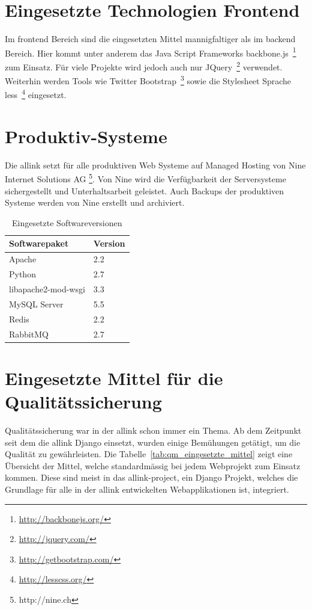 \section{Eingesetzte Technologien Frontend}
\label{sec:eingesetzte_technologien_frontend}
Im frontend Bereich sind die eingesetzten Mittel mannigfaltiger als im backend Bereich. Hier kommt unter anderem das  Java Script Frameworks backbone.js~\footnote{\url{http://backbonejs.org/}} zum Einsatz. Für viele Projekte wird jedoch auch nur JQuery~\footnote{\url{http://jquery.com/}} verwendet. Weiterhin werden Tools wie Twitter Bootstrap~\footnote{\url{http://getbootstrap.com/}} sowie die Stylesheet Sprache less~\footnote{\url{http://lesscss.org/}} eingesetzt.

\section{Produktiv-Systeme}
\label{sec:produktiv_systeme}
Die allink setzt für alle produktiven Web Systeme auf Managed Hosting von Nine Internet Solutions AG \footnote{http://nine.ch}. Von Nine wird die Verfügbarkeit der Serversysteme sichergestellt und Unterhaltsarbeit geleistet. Auch Backups der produktiven Systeme werden von Nine erstellt und archiviert.

\begin{table}[ht]
  \centering
  \begin{tabular}{ll}
  \toprule
    Softwarepaket & Version\\
  \midrule
    Apache & 2.2\\
  \hline
    Python & 2.7\\
  \hline
    libapache2-mod-wsgi & 3.3\\
  \hline
    MySQL Server & 5.5\\
  \hline
    Redis & 2.2\\
  \hline
    RabbitMQ & 2.7\\
  \bottomrule
  \end{tabular}
  \caption{Eingesetzte Softwareversionen}
  \label{tab:eingesetzte_softwareversionen}
\end{table}

\section{Eingesetzte Mittel für die Qualitätssicherung}
\label{sec:eingesetzte_mittel_für_die_qualitätssicherung}
Qualitätssicherung war in der allink schon immer ein Thema. Ab dem Zeitpunkt seit dem die allink Django einsetzt, wurden einige Bemühungen getätigt, um die Qualität zu gewährleisten. Die Tabelle~\ref{tab:qm_eingesetzte_mittel} zeigt eine Übersicht der Mittel, welche standardmässig bei jedem Webprojekt zum Einsatz kommen. Diese sind meist in das allink-project, ein Django Projekt, welches die Grundlage für alle in der allink entwickelten Webapplikationen ist, integriert.


